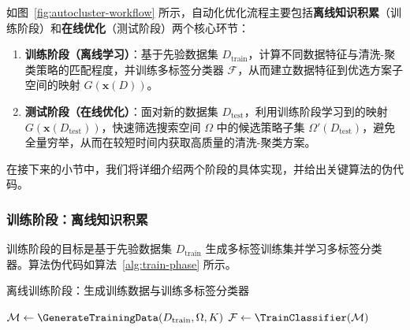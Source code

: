 \documentclass[10pt]{article} %
\numberwithin{equation}{section}
\begin{document}
如图~\ref{fig:autocluster-workflow} 所示，自动化优化流程主要包括\textbf{离线知识积累}（训练阶段）和\textbf{在线优化}（测试阶段）两个核心环节： \begin{enumerate} \item \textbf{训练阶段（离线学习）}：基于先验数据集 $D_{\text{train}}$，计算不同数据特征与清洗-聚类策略的匹配程度，并训练多标签分类器 $\mathcal{F}$，从而建立数据特征到优选方案子空间的映射 $G(\mathbf{x}(D))$。 \item \textbf{测试阶段（在线优化）}：面对新的数据集 $D_{\text{test}}$，利用训练阶段学习到的映射 $G(\mathbf{x}(D_{\text{test}}))$，快速筛选搜索空间 $\Omega$ 中的候选策略子集 $\Omega'(D_{\text{test}})$，避免全量穷举，从而在较短时间内获取高质量的清洗-聚类方案。 \end{enumerate}

在接下来的小节中，我们将详细介绍两个阶段的具体实现，并给出关键算法的伪代码。

\subsubsection{训练阶段：离线知识积累}
训练阶段的目标是基于先验数据集 \(D_{\text{train}}\) 生成多标签训练集并学习多标签分类器。算法伪代码如算法~\ref{alg:train-phase} 所示。

\begin{algorithm}[H]
\caption{离线训练阶段：生成训练数据与训练多标签分类器}
\label{alg:train-phase}


$\mathcal{M} \leftarrow \GenerateTrainingData(D_{\text{train}}, \Omega, K)$\;
$\mathcal{F} \leftarrow \TrainClassifier(\mathcal{M})$\;

\bigskip


\end{algorithm}
\end{document}
